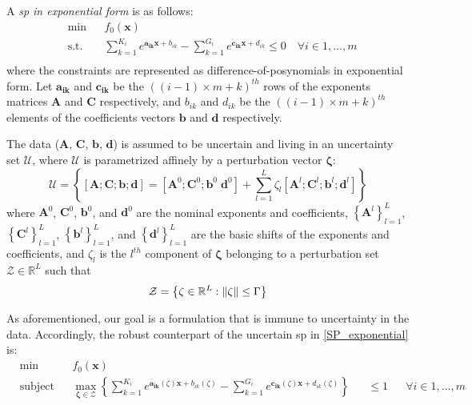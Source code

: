 A \emph{\gls{sp} in exponential form} is as follows:
\begin{equation}
    \label{SP_exponential}
\begin{aligned}
	& \min && f_0\left(\mathbf{x}\right) \\
	& \text{s.t.} && \textstyle{\sum}_{k=1}^{K_i}e^{\mathbf{a_{ik}}\mathbf{x} + b_{ik}} - \textstyle{\sum}_{k=1}^{G_i}e^{\mathbf{c_{ik}}\mathbf{x} + d_{ik}} \leq 0 \quad \forall i \in 1,...,m\\
\end{aligned}
\end{equation}
where the constraints are represented as difference-of-posynomials in exponential form.
Let $\mathbf{a_{ik}}$ and $\mathbf{c_{ik}}$ be the $((i-1)\times m + k)^{th}$ rows of the exponents matrices
$\mathbf{A}$ and $\mathbf{C}$ respectively, and $b_{ik}$ and $d_{ik}$ be the $((i-1)\times m + k)^{th}$ elements
of the coefficients vectors $\mathbf{b}$ and $\mathbf{d}$ respectively.

The data ($\mathbf{A}$, $\mathbf{C}$, $\mathbf{b}$, $\mathbf{d}$) is assumed to be uncertain and
living in an uncertainty set $\mathcal{U}$, where $\mathcal{U}$ is parametrized
affinely by a perturbation vector $\mathbf{\zeta}$:
\begin{equation}
\mathcal{U} = \left\{\left[\mathbf{A};\mathbf{C};\mathbf{b};\mathbf{d}\right] = \left[\mathbf{A}^0;\mathbf{C}^0;\mathbf{b}^0\;\mathbf{d}^0 \right] + \textstyle{\sum_{l=1}^{L}\zeta_l\left[\mathbf{A}^l;\mathbf{C}^l;\mathbf{b}^l; \mathbf{d}^l\right]}\right\}
\label{Data}
\end{equation}
where $\mathbf{A}^0$, $\mathbf{C}^0$, $\mathbf{b}^0$, and $\mathbf{d}^0$ are the nominal exponents and coefficients,
$\left\{\mathbf{A}^l\right\}_{l=1}^{L}$, $\left\{\mathbf{C}^l\right\}_{l=1}^{L}$, $\left\{\mathbf{b}^l\right\}_{l=1}^{L}$, and
$\left\{\mathbf{d}^l\right\}_{l=1}^{L}$ are the basic shifts of the exponents and coefficients,
and $\zeta_l$ is the $l^{th}$ component of $\mathbf{\zeta}$ belonging to a perturbation set $\mathcal{Z} \in \mathbb{R}^L$ such that
\begin{equation}
\mathcal{Z} = \left\{ \mathbf{\zeta} \in \mathbb{R}^L: \left\lVert\mathbf{\zeta}\right\rVert \leq \Gamma \right\}
\label{perturbation_set}
\end{equation}

As aforementioned, our goal is a formulation that is immune to
uncertainty in the data. Accordingly, the robust counterpart
of the uncertain \gls{sp} in \eqref{SP_exponential} is:
\begin{equation}
\begin{aligned}
& \min &&f_0\left(\mathbf{x}\right)\\
& \text{subject to} &&\max_{\mathbf{\zeta} \in \mathcal{Z}} \left\{\textstyle{\sum}_{k=1}^{K_i}e^{\mathbf{a_{ik}}\left(\zeta\right)\mathbf{x} + b_{ik}\left(\zeta\right)} - \textstyle{\sum}_{k=1}^{G_i}e^{\mathbf{c_{ik}}\left(\zeta\right)\mathbf{x} + d_{ik}\left(\zeta\right)}\right\} &&\leq 1 &&\forall i \in 1,...,m\\
\end{aligned}
\label{SP_counterparts_finite}
\end{equation}

